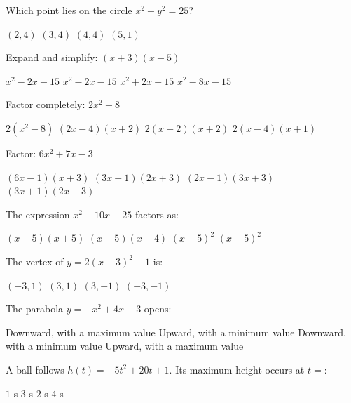 \documentclass[addpoints]{exam}
\begin{document}
\begin{questions}
\question[1] Which point lies on the circle $x^2 + y^2 = 25$?
\begin{choices}
    \choice $(2, 4)$
    \correctchoice $(3, 4)$
    \choice $(4, 4)$
    \choice $(5, 1)$
\end{choices}

\question[1] Expand and simplify: $(x + 3)(x - 5)$
\begin{choices}
    \choice $x^2 - 2x - 15$
    \correctchoice $x^2 - 2x - 15$
    \choice $x^2 + 2x - 15$
    \choice $x^2 - 8x - 15$
\end{choices}

\question[1] Factor completely: $2x^2 - 8$
\begin{choices}
    \choice $2(x^2 - 8)$
    \choice $(2x - 4)(x + 2)$
    \correctchoice $2(x-2)(x+2)$
    \choice $2(x-4)(x+1)$
\end{choices}

\question[1] Factor: $6x^2 + 7x - 3$
\begin{choices}
    \choice $(6x - 1)(x + 3)$
    \correctchoice $(3x - 1)(2x + 3)$
    \choice $(2x - 1)(3x + 3)$
    \choice $(3x + 1)(2x - 3)$
\end{choices}

\question[1] The expression $x^2 - 10x + 25$ factors as:
\begin{choices}
    \choice $(x-5)(x+5)$
    \choice $(x-5)(x-4)$
    \correctchoice $(x-5)^2$
    \choice $(x+5)^2$
\end{choices}

\question[1] The vertex of $y = 2(x - 3)^2 + 1$ is:
\begin{choices}
    \choice $(-3, 1)$
    \correctchoice $(3, 1)$
    \choice $(3, -1)$
    \choice $(-3, -1)$
\end{choices}

\question[1] The parabola $y = -x^2 + 4x - 3$ opens:
\begin{choices}
    \correctchoice Downward, with a maximum value
    \choice Upward, with a minimum value
    \choice Downward, with a minimum value
    \choice Upward, with a maximum value
\end{choices}

\question[1] A ball follows $h(t) = -5t^2 + 20t + 1$. Its maximum height occurs at $t =$:
\begin{choices}
    \choice $1$ s
    \choice $3$ s
    \correctchoice $2$ s
    \choice $4$ s
\end{choices}


\end{questions}
\end{document}
